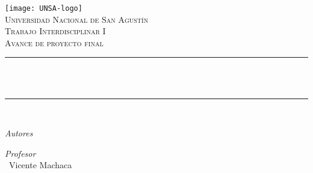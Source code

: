 \begin{titlepage}
  \centering
  \texttt{[image: UNSA-logo]}\\[0.5 cm]
  \textsc{\LARGE Universidad Nacional de San Agustín}\\[1.0 cm]
  \textsc{\Large Trabajo Interdisciplinar I}\\[0.5 cm]
  \textsc{\large Avance de proyecto final}\\[0.5cm]
  \rule{\linewidth}{0.2 mm}\\[0.4 cm]
  {\huge \bfseries \thetitle}\\
  \rule{\linewidth}{0.2 mm}\\[1.5 cm]

  \begin{flushleft}\large
    \emph{Autores}\\
    \theauthor
  \end{flushleft}
  \begin{flushleft}\large
    \emph{Profesor}\\
    \-\ Vicente Machaca
  \end{flushleft}

  \vfill

  {\large \thedate}

\end{titlepage}